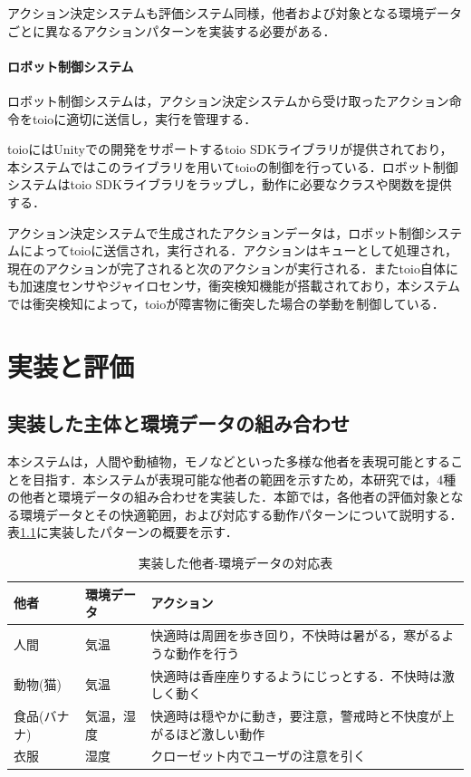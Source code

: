 \documentclass{cuxarticle}
\begin{document}
アクション決定システムも評価システム同様，他者および対象となる環境データごとに異なるアクションパターンを実装する必要がある．

\subsubsection{ロボット制御システム}
ロボット制御システムは，アクション決定システムから受け取ったアクション命令をtoioに適切に送信し，実行を管理する．

toioにはUnityでの開発をサポートするtoio SDKライブラリが提供されており，本システムではこのライブラリを用いてtoioの制御を行っている．ロボット制御システムはtoio SDKライブラリをラップし，動作に必要なクラスや関数を提供する．

アクション決定システムで生成されたアクションデータは，ロボット制御システムによってtoioに送信され，実行される．アクションはキューとして処理され，現在のアクションが完了されると次のアクションが実行される．またtoio自体にも加速度センサやジャイロセンサ，衝突検知機能が搭載されており，本システムでは衝突検知によって，toioが障害物に衝突した場合の挙動を制御している．

\chapter{実装と評価}

\section{実装した主体と環境データの組み合わせ}
本システムは，人間や動植物，モノなどといった多様な他者を表現可能とすることを目指す．本システムが表現可能な他者の範囲を示すため，本研究では，4種の他者と環境データの組み合わせを実装した．本節では，各他者の評価対象となる環境データとその快適範囲，および対応する動作パターンについて説明する．表\ref{table:entities}に実装したパターンの概要を示す．

\begin{table}[htbp]
  \caption{実装した他者-環境データの対応表}
  \label{table:entities}
  \centering
  \begin{tabular}{|l|l|l|}
    \hline
    他者 & 環境データ & アクション \\
    \hline
    人間 & 気温 &  快適時は周囲を歩き回り，不快時は暑がる，寒がるような動作を行う \\
    \hline
    動物(猫) & 気温 & 快適時は香座座りするようにじっとする．不快時は激しく動く \\
    \hline
    食品(バナナ) & 気温，湿度 & 快適時は穏やかに動き，要注意，警戒時と不快度が上がるほど激しい動作 \\
    \hline
    衣服 & 湿度 & クローゼット内でユーザの注意を引く \\
    \hline
  \end{tabular}
\end{table}
\end{document}
